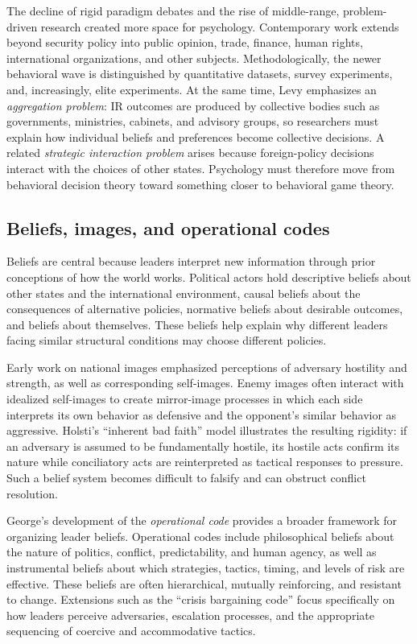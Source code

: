 The decline of rigid paradigm debates and the rise of middle-range, problem-driven research created more space for psychology. Contemporary work extends beyond security policy into public opinion, trade, finance, human rights, international organizations, and other subjects. Methodologically, the newer behavioral wave is distinguished by quantitative datasets, survey experiments, and, increasingly, elite experiments. At the same time, Levy emphasizes an \emph{aggregation problem}: IR outcomes are produced by collective bodies such as governments, ministries, cabinets, and advisory groups, so researchers must explain how individual beliefs and preferences become collective decisions. A related \emph{strategic interaction problem} arises because foreign-policy decisions interact with the choices of other states. Psychology must therefore move from behavioral decision theory toward something closer to behavioral game theory.

\subsection{Beliefs, images, and operational codes}

Beliefs are central because leaders interpret new information through prior conceptions of how the world works. Political actors hold descriptive beliefs about other states and the international environment, causal beliefs about the consequences of alternative policies, normative beliefs about desirable outcomes, and beliefs about themselves. These beliefs help explain why different leaders facing similar structural conditions may choose different policies.

Early work on national images emphasized perceptions of adversary hostility and strength, as well as corresponding self-images. Enemy images often interact with idealized self-images to create mirror-image processes in which each side interprets its own behavior as defensive and the opponent's similar behavior as aggressive. Holsti's ``inherent bad faith'' model illustrates the resulting rigidity: if an adversary is assumed to be fundamentally hostile, its hostile acts confirm its nature while conciliatory acts are reinterpreted as tactical responses to pressure. Such a belief system becomes difficult to falsify and can obstruct conflict resolution.

George's development of the \emph{operational code} provides a broader framework for organizing leader beliefs. Operational codes include philosophical beliefs about the nature of politics, conflict, predictability, and human agency, as well as instrumental beliefs about which strategies, tactics, timing, and levels of risk are effective. These beliefs are often hierarchical, mutually reinforcing, and resistant to change. Extensions such as the ``crisis bargaining code'' focus specifically on how leaders perceive adversaries, escalation processes, and the appropriate sequencing of coercive and accommodative tactics.

